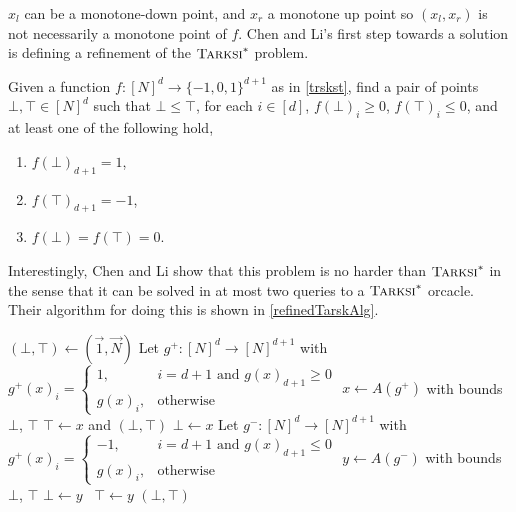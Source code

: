 $x_l$ can be a monotone-down point, and $x_r$ a monotone up point so $(x_l, x_r)$ is not necessarily
a monotone point of $f$. Chen and Li's first step towards a solution is defining a refinement of the
$\textsc{Tarksi}^*$ problem.
\begin{definition}
  Given a function $f : [N]^d \to \{-1, 0, 1\}^{d + 1}$ as in \cref{trskst}, find
  a pair of points $\bot, \top \in [N]^d$ such that $\bot \leq \top$, for each $i \in [d]$,
  $f(\bot)_i \geq 0$, $f(\top)_i \leq 0$, and at least one of the following hold,
  \begin{enumerate}
    \item $f(\bot)_{d + 1} = 1$,
    \item $f(\top)_{d + 1} = -1$,
    \item $f(\bot) = f(\top) = 0$.
  \end{enumerate}
\end{definition}
Interestingly, Chen and Li show that this problem is no harder than $\textsc{Tarksi}^*$ in the sense
that it can be solved in at most two queries to a $\textsc{Tarksi}^*$ orcacle. Their algorithm for doing this is
shown in \cref{refinedTarskAlg}.
\begin{algorithm}[H]
  \caption{\citep{chenLi}} \label{refinedTarskAlg}
  \begin{algorithmic}[1]
    \State $(\bot, \top) \gets (\vec{1}, \vec{N})$
    \State Let $g^+ : [N]^d \to [N]^{d+1}$ with $g^+(x)_i = 
      \begin{cases} 1, & i = d + 1 \text{ and } g(x)_{d + 1} \geq 0 \\ g(x)_i, & \text{otherwise}\end{cases}$
    \State $x \gets A(g^+)$ with bounds $\bot$, $\top$
    \State {} $\top \gets x$ and \Return $(\bot, \top)$ \EndIf
    \State $\bot \gets x$
  \State Let $g^- : [N]^d \to [N]^{d+1}$ with $g^+(x)_i = 
    \begin{cases} -1, & i = d + 1 \text{ and } g(x)_{d + 1} \leq 0 \\ g(x)_i, & \text{otherwise}\end{cases}$
    \State $y \gets A(g^-)$ with bounds $\bot$, $\top$
     $\bot \gets y$ \algorithmicelse\ $\top \gets y$ \EndIf
    \State \Return $(\bot, \top)$
  \EndProcedure
  \end{algorithmic}
\end{algorithm}
